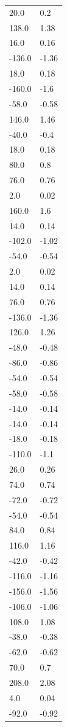 \begin{longtable}{ll}
20.0 & 0.2 \\
138.0 & 1.38 \\
16.0 & 0.16 \\
-136.0 & -1.36 \\
18.0 & 0.18 \\
-160.0 & -1.6 \\
-58.0 & -0.58 \\
146.0 & 1.46 \\
-40.0 & -0.4 \\
18.0 & 0.18 \\
80.0 & 0.8 \\
76.0 & 0.76 \\
2.0 & 0.02 \\
160.0 & 1.6 \\
14.0 & 0.14 \\
-102.0 & -1.02 \\
-54.0 & -0.54 \\
2.0 & 0.02 \\
14.0 & 0.14 \\
76.0 & 0.76 \\
-136.0 & -1.36 \\
126.0 & 1.26 \\
-48.0 & -0.48 \\
-86.0 & -0.86 \\
-54.0 & -0.54 \\
-58.0 & -0.58 \\
-14.0 & -0.14 \\
-14.0 & -0.14 \\
-18.0 & -0.18 \\
-110.0 & -1.1 \\
26.0 & 0.26 \\
74.0 & 0.74 \\
-72.0 & -0.72 \\
-54.0 & -0.54 \\
84.0 & 0.84 \\
116.0 & 1.16 \\
-42.0 & -0.42 \\
-116.0 & -1.16 \\
-156.0 & -1.56 \\
-106.0 & -1.06 \\
108.0 & 1.08 \\
-38.0 & -0.38 \\
-62.0 & -0.62 \\
70.0 & 0.7 \\
208.0 & 2.08 \\
4.0 & 0.04 \\
-92.0 & -0.92 \\

\end{longtable}

